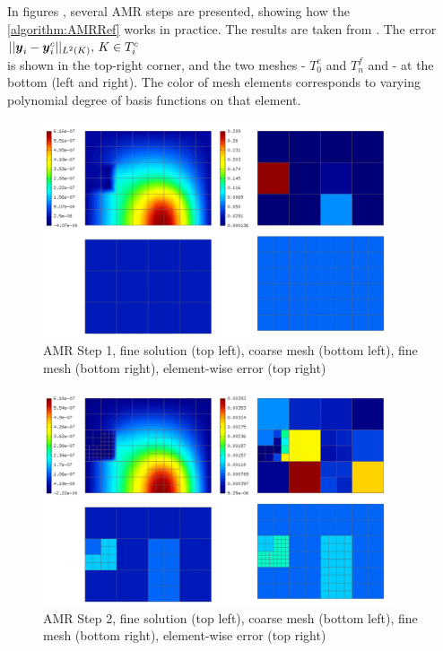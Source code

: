 In figures , several AMR steps are presented, showing how the \cref{algorithm:AMRRef} works in practice. The results are taken from \cite{diplomka}. The error $||\mbox{\boldmath $y$}_i - \mbox{\boldmath $y$}_i^c||_{L^2\left( K\right)},\, K \in T_i^c$\\ is shown in the top-right corner, and the two meshes - $T_0^{c}$ and $T_n^{f}$ and - at the bottom (left and right). The color of mesh elements corresponds to varying polynomial degree of basis functions on that element.

\begin{figure}[H]
	\begin{center}
		\includegraphics[width=0.92\textwidth]{img/adapt/ref/1.jpg}
		\caption{AMR Step 1, fine solution (top left), coarse mesh (bottom left), fine mesh (bottom right), element-wise error (top right)}
	\label{figure:amrRef1}
	\end{center}
\end{figure}
\vspace{-4mm}
\begin{figure}[H]
	\begin{center}
		\includegraphics[width=0.92\textwidth]{img/adapt/ref/2.jpg}
		\caption{AMR Step 2, fine solution (top left), coarse mesh (bottom left), fine mesh (bottom right), element-wise error (top right)}
	\label{figure:amrRef2}
	\end{center}
\end{figure}
